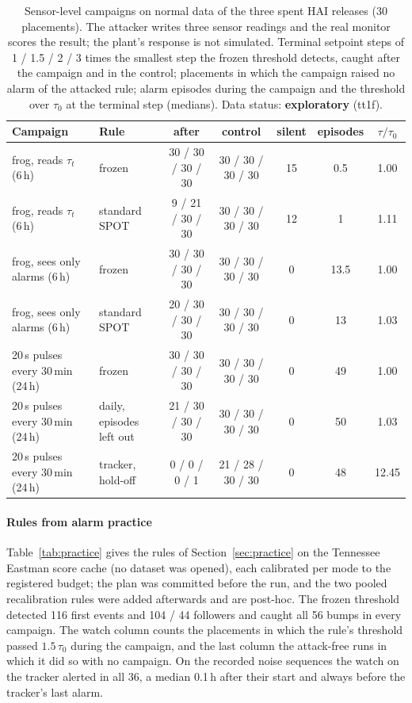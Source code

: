 \documentclass[sigconf]{acmart}
\begin{document}
\begin{table}[t]
\caption{Sensor-level campaigns on normal data of the three spent HAI releases (30 placements). The attacker
writes three sensor readings and the real monitor scores the result; the plant's response is not
simulated. Terminal setpoint steps of 1 / 1.5 / 2 / 3 times the smallest step the frozen threshold detects,
caught after the campaign and in the control; placements in which the campaign raised no alarm of the
attacked rule; alarm episodes during the campaign and the threshold over $\tau_0$ at the terminal step
(medians). Data status: \textbf{exploratory} (tt1f).}
\label{tab:process}
\small
\begin{tabularx}{\textwidth}{@{}LLccccc@{}}
\toprule
Campaign & Rule & after & control & silent & episodes & $\tau/\tau_0$ \\
\midrule
frog, reads $\tau_t$ (6\,h) & frozen & 30 / 30 / 30 / 30 & 30 / 30 / 30 / 30 & 15 & 0.5 & 1.00 \\
frog, reads $\tau_t$ (6\,h) & standard SPOT & 9 / 21 / 30 / 30 & 30 / 30 / 30 / 30 & 12 & 1 & 1.11 \\
frog, sees only alarms (6\,h) & frozen & 30 / 30 / 30 / 30 & 30 / 30 / 30 / 30 & 0 & 13.5 & 1.00 \\
frog, sees only alarms (6\,h) & standard SPOT & 20 / 30 / 30 / 30 & 30 / 30 / 30 / 30 & 0 & 13 & 1.03 \\
20\,s pulses every 30\,min (24\,h) & frozen & 30 / 30 / 30 / 30 & 30 / 30 / 30 / 30 & 0 & 49 & 1.00 \\
20\,s pulses every 30\,min (24\,h) & daily, episodes left out & 21 / 30 / 30 / 30 & 30 / 30 / 30 / 30 & 0 & 50 & 1.03 \\
20\,s pulses every 30\,min (24\,h) & tracker, hold-off & 0 / 0 / 0 / 1 & 21 / 28 / 30 / 30 & 0 & 48 & 12.45 \\
\bottomrule
\end{tabularx}
\end{table}

\paragraph{Rules from alarm practice}
Table~\ref{tab:practice} gives the rules of Section~\ref{sec:practice} on the Tennessee Eastman score
cache (no dataset was opened), each calibrated per mode to the registered budget; the plan was committed
before the run, and the two pooled recalibration rules were added afterwards and are post-hoc. The frozen
threshold detected 116 first events and 104 / 44 followers and caught all 56 bumps in every campaign. The watch
column counts the placements in which the rule's threshold passed $1.5\,\tau_0$ during the campaign, and
the last column the attack-free runs in which it did so with no campaign. On the recorded noise sequences
the watch on the tracker alerted in all 36, a median 0.1\,h after their start and always before the
tracker's last alarm.
\end{document}
